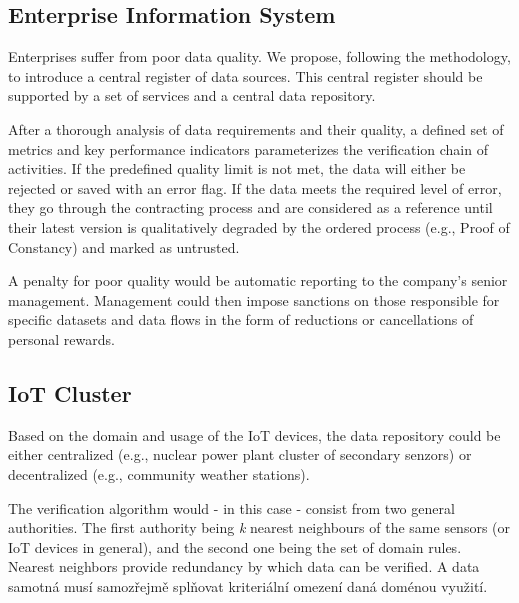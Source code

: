 \subsection{Enterprise Information System}

Enterprises suffer from poor data quality.
We propose, following the methodology, to introduce a central register of data sources.
This central register should be supported by a set of services and a central data repository.

After a thorough analysis of data requirements and their quality, a defined set of metrics and key performance indicators parameterizes the verification chain of activities.
If the predefined quality limit is not met, the data will either be rejected or saved with an error flag.
If the data meets the required level of error, they go through the contracting process and are considered as a reference until their latest version is qualitatively degraded by the ordered process (e.g., Proof of Constancy) and marked as untrusted.

A penalty for poor quality would be automatic reporting to the company's senior management.
Management could then impose sanctions on those responsible for specific datasets and data flows in the form of reductions or cancellations of personal rewards.

\subsection{IoT Cluster}

Based on the domain and usage of the IoT devices, the data repository could be either centralized (e.g., nuclear power plant cluster of secondary senzors) or decentralized (e.g., community weather stations).

The verification algorithm would - in this case - consist from two general authorities.
The first authority being \textit{k} nearest neighbours of the same sensors (or IoT devices in general), and the second one being the set of domain rules.
Nearest neighbors provide redundancy by which data can be verified.
A data samotná musí samozřejmě splňovat kriteriální omezení daná doménou využití.

